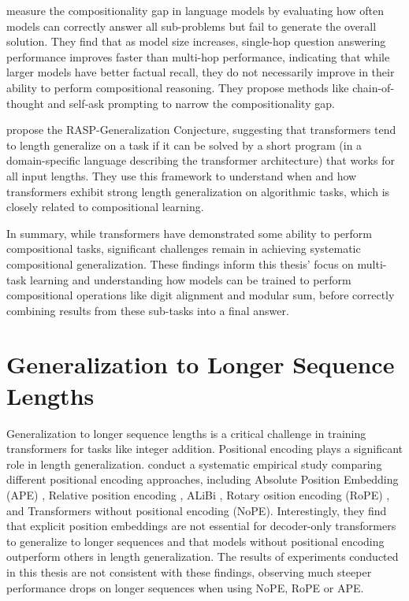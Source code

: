 \cite{press_measuring_2023} measure the compositionality gap in language models by evaluating how often models can correctly answer all sub-problems but fail to generate the overall solution. They find that as model size increases, single-hop question answering performance improves faster than multi-hop performance, indicating that while larger models have better factual recall, they do not necessarily improve in their ability to perform compositional reasoning. They propose methods like chain-of-thought and self-ask prompting to narrow the compositionality gap.

\cite{zhou_what_2023} propose the RASP-Generalization Conjecture, suggesting that transformers tend to length generalize on a task if it can be solved by a short program (in a domain-specific language describing the transformer architecture) that works for all input lengths. They use this framework to understand when and how transformers exhibit strong length generalization on algorithmic tasks, which is closely related to compositional learning.

In summary, while transformers have demonstrated some ability to perform compositional tasks, significant challenges remain in achieving systematic compositional generalization. These findings inform this thesis' focus on multi-task learning and understanding how models can be trained to perform compositional operations like digit alignment and modular sum, before correctly combining results from these sub-tasks into a final answer.

\section{Generalization to Longer Sequence Lengths}\label{sec:sota_generalization_to_longer_sequences}

Generalization to longer sequence lengths is a critical challenge in training transformers for tasks like integer addition. Positional encoding plays a significant role in length generalization. \cite{kazemnejad_impact_2023} conduct a systematic empirical study comparing different positional encoding approaches, including Absolute Position Embedding (APE) \parencite{vaswani_attention_2017}, Relative position encoding \parencite{shaw_self-attention_2018}, ALiBi \parencite{alibi}, Rotary osition encoding (RoPE) \parencite{su_roformer_2024}, and Transformers without positional encoding (NoPE). Interestingly, they find that explicit position embeddings are not essential for decoder-only transformers to generalize to longer sequences and that models without positional encoding outperform others in length generalization. The results of experiments conducted in this thesis are not consistent with these findings, observing much steeper performance drops on longer sequences when using NoPE, RoPE or APE.

